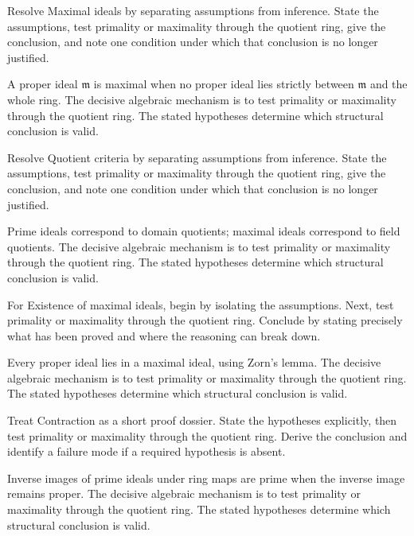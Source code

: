 \begin{problem}\label{prob:v02-problem-02}
Resolve Maximal ideals by separating assumptions from inference. State the assumptions, test primality or maximality through the quotient ring, give the conclusion, and note one condition under which that conclusion is no longer justified.
\end{problem}
\begin{solution}
A proper ideal $\mathfrak m$ is maximal when no proper ideal lies strictly between $\mathfrak m$ and the whole ring. The decisive algebraic mechanism is to test primality or maximality through the quotient ring. The stated hypotheses determine which structural conclusion is valid.
\end{solution}

\begin{problem}\label{prob:v02-problem-03}
Resolve Quotient criteria by separating assumptions from inference. State the assumptions, test primality or maximality through the quotient ring, give the conclusion, and note one condition under which that conclusion is no longer justified.
\end{problem}
\begin{solution}
Prime ideals correspond to domain quotients; maximal ideals correspond to field quotients. The decisive algebraic mechanism is to test primality or maximality through the quotient ring. The stated hypotheses determine which structural conclusion is valid.
\end{solution}

\begin{problem}\label{prob:v02-problem-04}
For Existence of maximal ideals, begin by isolating the assumptions. Next, test primality or maximality through the quotient ring. Conclude by stating precisely what has been proved and where the reasoning can break down.
\end{problem}
\begin{solution}
Every proper ideal lies in a maximal ideal, using Zorn's lemma. The decisive algebraic mechanism is to test primality or maximality through the quotient ring. The stated hypotheses determine which structural conclusion is valid.
\end{solution}

\begin{problem}\label{prob:v02-problem-05}
Treat Contraction as a short proof dossier. State the hypotheses explicitly, then test primality or maximality through the quotient ring. Derive the conclusion and identify a failure mode if a required hypothesis is absent.
\end{problem}
\begin{solution}
Inverse images of prime ideals under ring maps are prime when the inverse image remains proper. The decisive algebraic mechanism is to test primality or maximality through the quotient ring. The stated hypotheses determine which structural conclusion is valid.
\end{solution}

